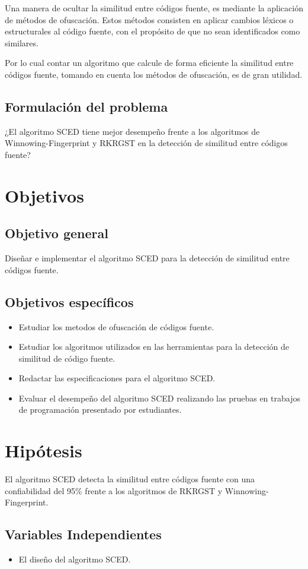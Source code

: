 Una manera de ocultar la similitud entre códigos fuente, es mediante la aplicación de métodos de ofuscación. Estos métodos consisten en aplicar cambios léxicos o estructurales al código fuente, con el propósito de que no sean identificados como similares.

Por lo cual contar un algoritmo que calcule de forma eficiente la similitud entre códigos fuente, tomando en cuenta los métodos de ofuscación, es de gran utilidad.

\subsection{Formulación del problema}
¿El algoritmo SCED tiene mejor desempeño frente a los algoritmos de Winnowing-Fingerprint y RKRGST en la detección de similitud entre códigos fuente?
\section{Objetivos}
\subsection{Objetivo general}
Diseñar e implementar el algoritmo SCED para la detección de similitud entre códigos fuente.
\subsection{Objetivos específicos}
\begin{itemize}
    \item Estudiar los metodos de ofuscación de códigos fuente.
    \item Estudiar los algoritmos utilizados en las herramientas para la detección de similitud de código fuente.
    \item Redactar las especificaciones para el algoritmo SCED.
    \item Evaluar el desempeño del algoritmo SCED realizando las pruebas en trabajos de programación presentado por estudiantes.
\end{itemize}

\section{Hipótesis}
El algoritmo SCED detecta la similitud entre códigos fuente con una confiabilidad del 95\% frente a los algoritmos de RKRGST y Winnowing-Fingerprint.
\subsection{Variables Independientes}
\begin{itemize}
    \item El diseño del algoritmo SCED.
\end{itemize}
